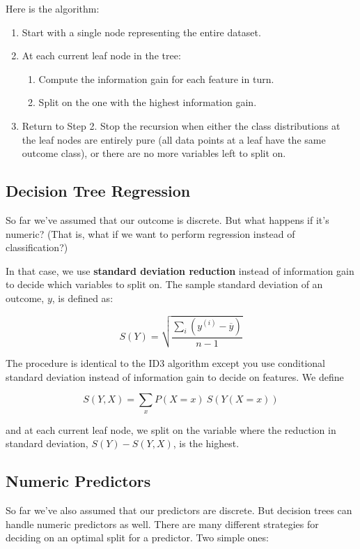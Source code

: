 Here is the algorithm:
\begin{enumerate}
\item Start with a single node representing the entire dataset.
\item At each current leaf node in the tree:
\begin{enumerate}
\item Compute the information gain for each feature in turn.
\item Split on the one with the highest information gain.
\end{enumerate}
\item Return to Step 2. Stop the recursion when either the class distributions at the leaf nodes are entirely pure (all data points at a leaf have the same outcome class), or there are no more variables left to split on.
\end{enumerate}

\subsection{Decision Tree Regression}

So far we've assumed that our outcome is discrete. But what happens if it's numeric? (That is, what if we want to perform regression instead of classification?)

In that case, we use \textbf{standard deviation reduction} instead of information gain to decide which variables to split on. The sample standard deviation of an outcome, $y$, is defined as:

$$ S(Y) = \sqrt{\frac{\sum_i(y^{(i)} - \overline{y})}{n-1}} $$

The procedure is identical to the ID3 algorithm except you use conditional standard deviation instead of information gain to decide on features. We define

$$ S(Y, X) = \sum_{x} P(X = x)~ S(Y(X=x)) $$

and at each current leaf node, we split on the variable where the reduction in standard deviation, $S(Y) - S(Y,X)$, is the highest. 

\subsection{Numeric Predictors}

So far we've also assumed that our predictors are discrete. But decision trees can handle numeric predictors as well. There are many different strategies for deciding on an optimal split for a predictor. Two simple ones:

